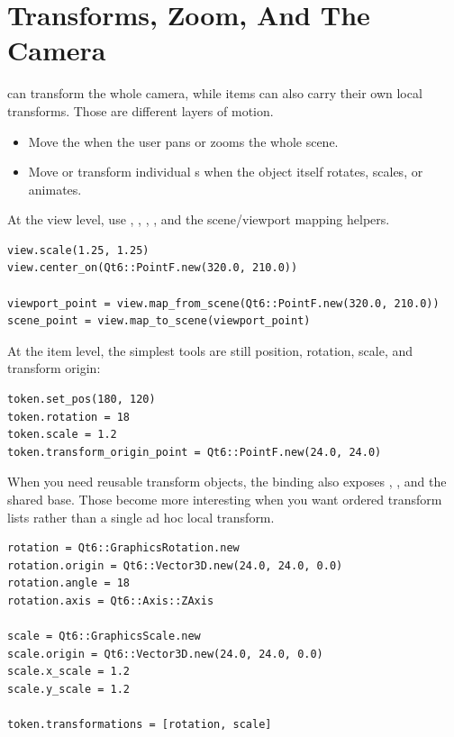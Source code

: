 \section{Transforms, Zoom, And The Camera}

 can transform the whole camera, while items can also carry their own local transforms. Those are different layers of motion.

\begin{itemize}
\item Move the  when the user pans or zooms the whole scene.
\item Move or transform individual s when the object itself rotates, scales, or animates.
\end{itemize}

At the view level, use , , , , and the scene/viewport mapping helpers.

\begin{lstlisting}[style=crystal]
view.scale(1.25, 1.25)
view.center_on(Qt6::PointF.new(320.0, 210.0))

viewport_point = view.map_from_scene(Qt6::PointF.new(320.0, 210.0))
scene_point = view.map_to_scene(viewport_point)
\end{lstlisting}

At the item level, the simplest tools are still position, rotation, scale, and transform origin:

\begin{lstlisting}[style=crystal]
token.set_pos(180, 120)
token.rotation = 18
token.scale = 1.2
token.transform_origin_point = Qt6::PointF.new(24.0, 24.0)
\end{lstlisting}

When you need reusable transform objects, the binding also exposes , , and the shared  base. Those become more interesting when you want ordered transform lists rather than a single ad hoc local transform.

\begin{lstlisting}[style=crystal]
rotation = Qt6::GraphicsRotation.new
rotation.origin = Qt6::Vector3D.new(24.0, 24.0, 0.0)
rotation.angle = 18
rotation.axis = Qt6::Axis::ZAxis

scale = Qt6::GraphicsScale.new
scale.origin = Qt6::Vector3D.new(24.0, 24.0, 0.0)
scale.x_scale = 1.2
scale.y_scale = 1.2

token.transformations = [rotation, scale]
\end{lstlisting}

